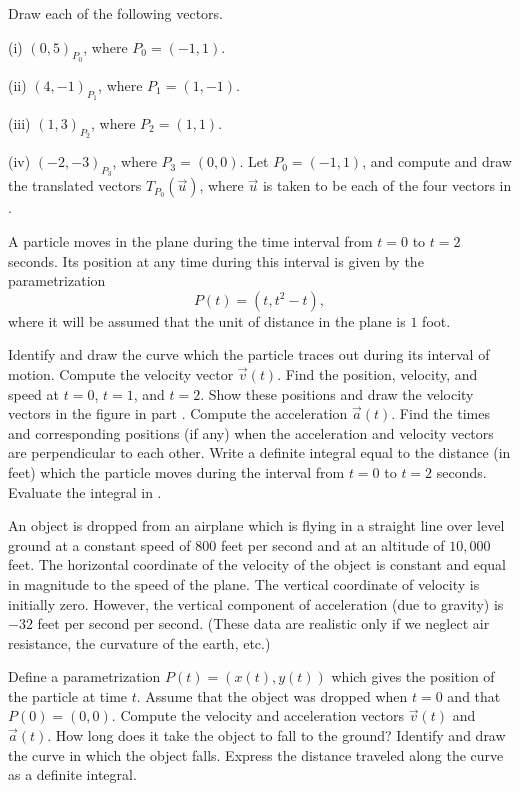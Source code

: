 \begin{exercises}

\begin{exenum}
\x
{}
Draw each of the following vectors.

(i) $(0,5)_{P_0}$, where $P_0 = (-1,1)$.

(ii) $(4,-1)_{P_1}$, where $P_1 = (1,-1)$.

(iii) $(1,3)_{P_2}$, where $P_2 = (1,1)$.

(iv) $(-2,-3)_{P_3}$, where $P_3 = (0,0)$.
\x
Let $P_0 = (-1,1)$, and compute and draw the
translated vectors $T_{P_0}(\vec u)$,
where $\vec u$ is taken to be each of the four
vectors in .
\end{exenum}

A particle moves in the plane during the time interval
from $t=0$ to $t=2$ seconds.
Its position at any time during this interval is given
by the parametrization
\[
P(t) = (t,t^2-t)
,
\]
where it will be assumed that the unit of
distance in the plane is $1$ foot.
\begin{exenum}
\x
{}
Identify and draw the curve which the particle traces
out during its interval of motion.
\x
Compute the velocity vector $\vec v(t)$.
Find the position, velocity, and speed at
$t=0$, $t=1$, and $t=2$.
Show these positions and draw the velocity
vectors in the figure in part .
\x
Compute the acceleration $\vec a(t)$.
Find the times and corresponding positions
(if any) when the acceleration and velocity vectors
are perpendicular to each other.
\x
{}
Write a definite integral equal to the distance (in feet)
which the particle moves during the interval
from $t=0$ to $t=2$ seconds.
\x
Evaluate the integral in .
\end{exenum}

An object is dropped from an airplane which is
flying in a straight line over level ground at a constant
speed of $800$ feet per second and at an
altitude of $10,000$ feet.
The horizontal coordinate of the velocity of the object
is constant and equal in magnitude to the speed
of the plane.
The vertical coordinate of velocity is initially zero.
However, the vertical component of acceleration
(due to gravity) is $-32$ feet per second per second.
(These data are realistic only if we neglect air
resistance, the curvature of the earth, etc.)
\begin{exenum}
\x
Define a parametrization $P(t)=(x(t),y(t))$ which gives
the position of the particle at time $t$.
Assume that the object was dropped when $t=0$
and that $P(0) = (0,0)$.
Compute the velocity and acceleration vectors
$\vec v(t)$ and $\vec a(t)$.
\x
How long does it take the object to fall to the ground?
\x
Identify and draw the curve in which the object falls.
\x
Express the distance traveled along the curve as
a definite integral.
\end{exenum}


\end{exercises}
